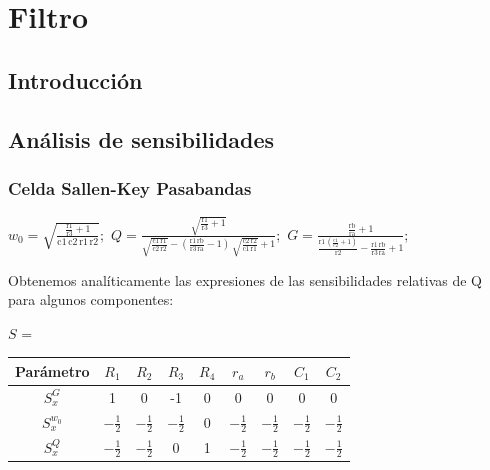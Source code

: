 \documentclass[../tc_tpfinal_main.tex]{subfiles}
\begin{document}
\chapter{Filtro}

\section{Introducción}

\section{Análisis de sensibilidades}
\subsection{Celda Sallen-Key Pasabandas}
\begin{center}
$w_0 = \sqrt{\frac{\frac{\mathrm{r1}}{\mathrm{r3}} + 1}{\mathrm{c1}\, \mathrm{c2}\, \mathrm{r1}\, \mathrm{r2}}}
;$
$Q = \frac{\sqrt{\frac{\mathrm{r1}}{\mathrm{r3}} + 1}}{\sqrt{\frac{\mathrm{c1}\, \mathrm{r1}}{\mathrm{c2}\, \mathrm{r2}}} - \left(\frac{\mathrm{r1}\, \mathrm{rb}}{\mathrm{r3}\, \mathrm{ra}} - 1\right)\, \sqrt{\frac{\mathrm{c2}\, \mathrm{r2}}{\mathrm{c1}\, \mathrm{r1}}} + 1}
;$
$G = \frac{\frac{\mathrm{rb}}{\mathrm{ra}} + 1}{\frac{\mathrm{r1}\, \left(\frac{\mathrm{c1}}{\mathrm{c2}} + 1\right)}{\mathrm{r2}} - \frac{\mathrm{r1}\, \mathrm{rb}}{\mathrm{r3}\, \mathrm{ra}} + 1}
;$
\end{center}

Obtenemos analíticamente las expresiones de las sensibilidades relativas de Q para algunos componentes: \par

$S^{}_{} =$ \par
			 	\begin{table}[H] 
				\centering
 				\begin{tabular}{||c c c c c c c c c||} 
 					\hline
				  Parámetro& $R_1$ & $R_2$ & $R_3$ & $R_4$ & $r_a$ & $r_b$&$C_1$&$C_2$\\ [0.5ex] 
 					\hline\hline
					 $S^G_x$& 1 & 0& -1& 0&0&0&0&0\\
					 $S^{w_0}_x$& $- \frac{1}{2}$ &$- \frac{1}{2}$& $- \frac{1}{2}$& 0&$- \frac{1}{2}$&$- \frac{1}{2}$&$- \frac{1}{2}$&$- \frac{1}{2}$\\
					 $S^{Q}_x$&$- \frac{1}{2}$ &$- \frac{1}{2}$& 0& 1&$- \frac{1}{2}$&$- \frac{1}{2}$&$- \frac{1}{2}$&$- \frac{1}{2}$\\[1ex] 
					\hline
				\end{tabular}
			\end{table}
\end{document}
